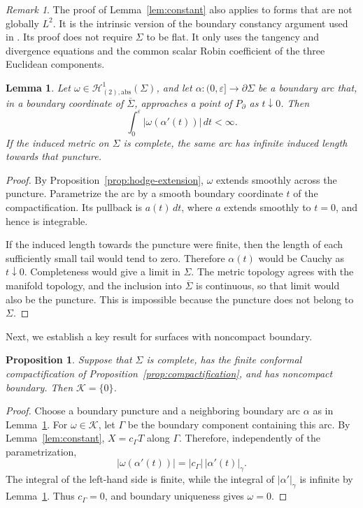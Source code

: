 \documentclass[11pt]{amsart}
\numberwithin{equation}{section}
\newtheorem{proposition}[theorem]{Proposition}
\newtheorem{lemma}[theorem]{Lemma}
\theoremstyle{definition}
\theoremstyle{remark}
\newtheorem{remark}[theorem]{Remark}
\newcommand{\HH}{\mathcal H}
\newcommand{\KK}{\mathcal K}
\newcommand{\Sigmabar}{\overline\Sigma}
\newcommand{\dd}{\,d}
\begin{document}
\begin{remark}
The proof of Lemma~\ref{lem:constant} also applies to forms that are not globally $L^2$. It is the intrinsic version of the boundary constancy argument used in \cite{Mendes26}. Its proof does not require $\Sigma$ to be flat. It only uses the tangency and divergence equations and the common scalar Robin coefficient of the three Euclidean components.
\end{remark}

\begin{lemma}\label{lem:finite-integral}
Let $\omega\in\HH^1_{(2),\mathrm{abs}}(\Sigma)$, and let $\alpha:(0,\varepsilon]\to\partial\Sigma$ be a boundary arc that, in a boundary coordinate of $\Sigmabar$, approaches a point of $P_{\partial}$ as $t\downarrow0$. Then
\[
\int_0^\varepsilon|\omega(\alpha'(t))|\dd t<\infty.
\]
If the induced metric on $\Sigma$ is complete, the same arc has infinite induced length towards that puncture.
\end{lemma}
\begin{proof}
By Proposition~\ref{prop:hodge-extension}, $\omega$ extends smoothly across the puncture. Parametrize the arc by a smooth boundary coordinate $t$ of the compactification. Its pullback is $a(t)\dd t$, where $a$ extends smoothly to $t=0$, and hence is integrable.

If the induced length towards the puncture were finite, then the length of each sufficiently small tail would tend to zero. Therefore $\alpha(t)$ would be Cauchy as $t\downarrow0$. Completeness would give a limit in $\Sigma$. The metric topology agrees with the manifold topology, and the inclusion into $\Sigmabar$ is continuous, so that limit would also be the puncture. This is impossible because the puncture does not belong to $\Sigma$.
\end{proof}

Next, we establish a key result for surfaces with noncompact boundary.

\begin{proposition}\label{prop:vanishing}
Suppose that $\Sigma$ is complete, has the finite conformal compactification of Proposition~\ref{prop:compactification}, and has noncompact boundary. Then $\KK=\{0\}$.
\end{proposition}
\begin{proof}
Choose a boundary puncture and a neighboring boundary arc $\alpha$ as in Lemma~\ref{lem:finite-integral}. For $\omega\in\KK$, let $\Gamma$ be the boundary component containing this arc. By Lemma~\ref{lem:constant}, $X=c_\Gamma T$ along $\Gamma$. Therefore, independently of the parametrization,
\[
|\omega(\alpha'(t))|=|c_\Gamma|\,|\alpha'(t)|_\gamma.
\]
The integral of the left-hand side is finite, while the integral of $|\alpha'|_\gamma$ is infinite by Lemma~\ref{lem:finite-integral}. Thus $c_\Gamma=0$, and boundary uniqueness gives $\omega=0$.
\end{proof}
\end{document}
